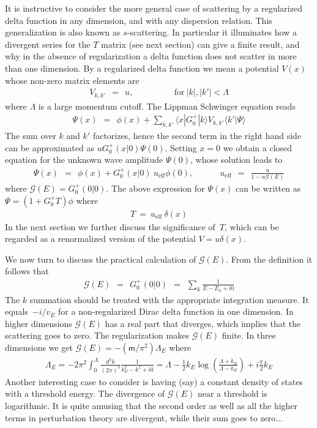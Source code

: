 \documentclass[onecolumn,fleqn]{revtex4}
\newcommand{\mass}{\mathsf{m}}
\newcommand{\tbox}[1]{\text{#1}}
\newcommand{\beq}{\begin{eqnarray}}
\newcommand{\eeq}{\end{eqnarray}}
\begin{document}
It is instructive to consider the more general case of 
scattering  by a regularized delta function in any dimension, 
and with any dispersion relation. 
This generalization is also known as $s$-scattering.
In particular it illuminates how a divergent 
series for the $T$ matrix (see next section) can give a finite result, 
and why in the absence of regularization 
a delta function does not scatter in more 
than one dimension. By a regularized delta function 
we mean a potential $V(x)$ whose non-zero matrix elements are 
\beq
V_{k,k'} \ \ = \ \ u,
\hspace{2cm} \text{for} \ |k|,|k'| < \Lambda 
\eeq
where $\Lambda$ is a large momentum cutoff.  
The Lippman Schwinger equation reads 
\beq
\Psi(x) \ \ = \ \ \phi(x) +  \sum_{k,k'}   \langle x|G_0^{+}|k \rangle  V_{k,k'} \langle k'|\Psi\rangle 
\eeq
The sum over $k$ and $k'$ factorizes, hence the second term 
in the right hand side can be approximated as $uG_0^{+}(x|0)\Psi(0)$.
Setting $x=0$ we obtain a closed equation for the unknown 
wave amplitude $\Psi(0)$, whose solution leads to  
\beq
\Psi(x) \ \ = \ \ \phi(x) + G_0^{+}(x|0) \ u_{\tbox{eff}} \phi(0), 
\ \ \ \ \ \ \ \ \ \ \ \ \ \  
u_{\tbox{eff}} \ \ = \ \ \frac{u}{1-u\mathcal{G}(E)}
\eeq
where $\mathcal{G}(E) = G_0^{+}(0|0)$.  
The above expression for $\Psi(x)$ can be written as ${\Psi=(1+G_0^{+}T)\phi}$ where 
\beq
T \  = \ u_{\tbox{eff}} \ \delta(x)
\eeq
In the next section we further discuss the significance of~$T$, 
which can be regarded as a renormalized version of the potential ${V=u\delta(x)}$.


We now turn to discuss the practical calculation 
of ${\mathcal{G}(E)}$. From the definition it follows that 
\beq
\mathcal{G}(E) \ \ = \ \  G_0^{+}(0|0)  \ \ = \ \ \sum_k \frac{1}{E-E_k+i0} 
\eeq
The $k$ summation should be treated with the appropriate integration measure.
It equals~$-i/v_E$ for a non-regularized Dirac delta function 
in one dimension.  
In higher dimensions $\mathcal{G}(E)$
has a real part that diverges, 
which implies that the scattering goes 
to zero.  The regularization makes $\mathcal{G}(E)$ 
finite. In three dimensions we 
get $\mathcal{G}(E)=-(\mass/\pi^2)\Lambda_E$ where 
\beq
\Lambda_E = 
-2\pi^2 
\int_0^{\Lambda} 
\frac{d^3k}{(2\pi)^3} 
\frac{1}{k_E^2-k^2+i0} 
= 
\Lambda
-\frac{1}{2}k_E\log\left(\frac{\Lambda+k_E}{\Lambda-k_E}\right)
+i\frac{\pi}{2}k_E 
\eeq
Another interesting case to consider is having  
(say) a constant density of states with a threshold energy. 
The divergence of $\mathcal{G}(E)$ near a threshold 
is logarithmic.  It is quite amusing that 
the second order as well as all the higher 
terms in perturbation theory are divergent, 
while their sum goes to zero... 
\end{document}

